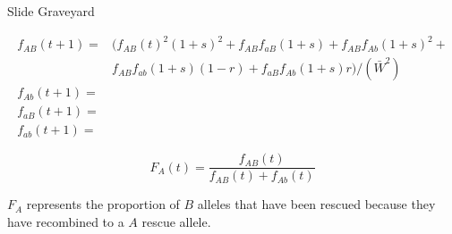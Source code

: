 \documentclass{beamer}
\begin{document}
\begin{frame}{Slide Graveyard}


    \begin{equation*}
    \begin{aligned}
        f_{AB}(t+1)= &(f_{AB}(t)^2(1+s)^2+f_{AB}f_{aB}(1+s)+f_{AB}f_{Ab}(1+s)^2+ \\
        &f_{AB}f_{ab}(1+s)(1-r)+f_{aB}f_{Ab}(1+s)r)/(\bar{W}^2) \\
        f_{Ab}(t+1)=    \\
        f_{aB}(t+1)=    \\
        f_{ab}(t+1)=
        \end{aligned}
    \end{equation*}
    
\begin{equation*}
    F_A(t)= \frac{f_{AB}(t)}{f_{AB}(t)+f_{Ab}(t)}
\end{equation*}

$F_A$ represents the proportion of $B$ alleles that have been rescued because they have recombined to a $A$ rescue allele.
\end{frame}
\end{document}
